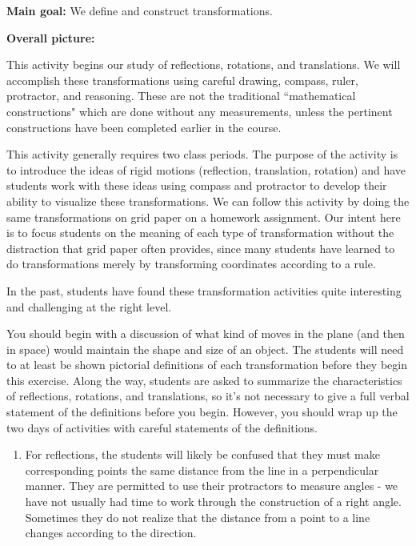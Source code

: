 \documentclass[nooutcomes,noauthor, handout]{ximera}
\begin{document}

\newpage


\begin{instructorNotes}
{\bf Main goal:} We define and construct transformations.

{\bf Overall picture:} 

This activity begins our study of reflections, rotations, and translations.  We will accomplish these transformations using careful drawing, compass, ruler, protractor, and reasoning.  These are not the traditional ``mathematical constructions" which are done without any measurements, unless the pertinent constructions have been completed earlier in the course.


This activity generally requires two class periods.  The purpose of the activity is to  introduce the ideas of rigid motions (reflection, translation, rotation) and have students work with these ideas using compass and protractor to develop their ability to visualize these transformations.  We can follow this activity by doing the same transformations on grid paper on a homework assignment.  Our intent here is to focus students on the meaning of each type of transformation without the distraction that grid paper often provides, since many students have learned to do transformations merely by transforming coordinates according to a rule.

In the past, students have found these transformation activities quite interesting and challenging at the right level.

You should begin with a discussion of what kind of moves in the plane (and then in space) would maintain the shape and size of an object. The students will need to at least be shown pictorial definitions of each transformation before they begin this exercise.  Along the way, students are asked to summarize the characteristics of reflections, rotations, and translations, so it's not necessary to give a full verbal statement of the definitions before you begin. However, you should wrap up the two days of activities with careful statements of the definitions.  

\begin{enumerate}
\item For reflections, the students will likely be confused that they must make corresponding points the same distance from the line in a perpendicular manner. They are permitted to use their protractors to measure angles - we have not usually had time to work through the construction of a right angle.  Sometimes they do not realize that the distance from a point to a line changes according to the direction.\\ 


\end{enumerate}
\end{instructorNotes}
\end{document}
